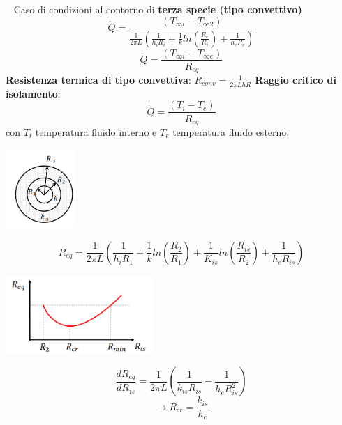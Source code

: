 \ \newline
\newline
Caso di condizioni al contorno di \textbf{terza specie (tipo convettivo)}
\[
    \dot{Q} = \frac{(T_{\infty i}-T_{\infty 2})}{\frac{1}{2\pi L}\left( \frac{1}{h_i R_i} + \frac{1}{k}ln\left(\frac{R_e}{R_i}\right) + \frac{1}{h_eR_e}\right)}
\] 
\[
    \dot{Q}= \frac{(T_{\infty i} - T_{\infty e})}{R_{eq}}
\]
\textbf{Resistenza termica di tipo convettiva}: $R_{conv} = \frac{1}{2\pi L h R}$
\newline
\newline
\textbf{Raggio critico di isolamento}:
\[
    \dot{Q} = \frac{(T_i - T_e)}{R_{eq}}
\]
con $T_i$ temperatura fluido interno e $T_e$ temperatura fluido esterno.
\begin{center}
    \includegraphics[height=3cm]{../L10/img9.PNG}
\end{center}
\[
    R_{eq} = \frac{1}{2\pi L}\left( \frac{1}{h_i R_1} + \frac{1}{k} ln \left(\frac{R_2}{R_1}\right) + \frac{1}{K_{is}} ln \left(\frac{R_{is}}{R_2}\right) + \frac{1}{h_eR_{is}}\right)
\]
\begin{center}
    \includegraphics[height=3cm]{../L10/img10.PNG}
\end{center}
\[
    \frac{dR_{eq}}{dR_{is}} = \frac{1}{2 \pi L} \left(\frac{1}{k_{is} R_{is}} - \frac{1}{h_e R_{is}^2}\right)
\]
\[
    \rightarrow R_{cr} = \frac{k_{is}}{h_e}
\]
